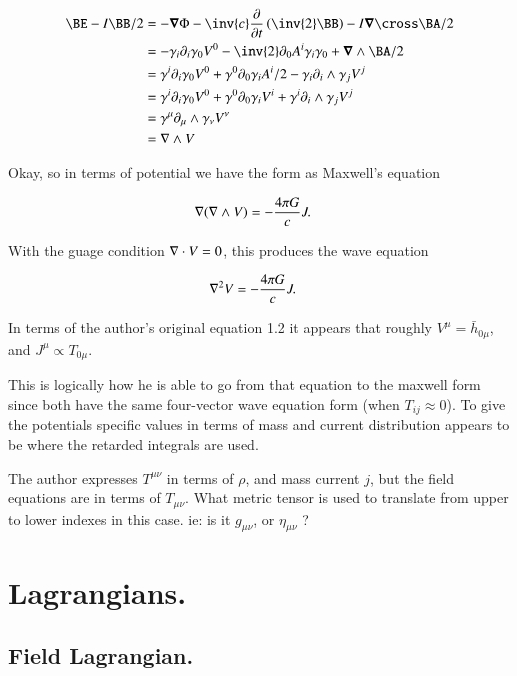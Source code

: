 \documentclass{article}
\newcommand{\barh}[0]{\bar{h}}
\begin{document}
\begin{align*}
\BE - I\BB/2 
&= - \spacegrad \Phi -\inv{c} \PD{t}{}\left( \inv{2} \BB \right) - I\spacegrad \cross \BA/2 \\
&= - \gamma_i \partial_i \gamma_0 V^0 - \inv{2} \partial_0 A^i \gamma_i \gamma_0 + \spacegrad \wedge \BA/2 \\
&= \gamma^i \partial_i \gamma_0 V^0 + \gamma^0 \partial_0 \gamma_i A^i/2 - \gamma_i \partial_i \wedge \gamma_j V^j \\
&= \gamma^i \partial_i \gamma_0 V^0 + \gamma^0 \partial_0 \gamma_i V^i + \gamma^i \partial_i \wedge \gamma_j V^j \\
&= \gamma^\mu \partial_\mu \wedge \gamma_\nu V^\nu \\
&= \grad \wedge V
\end{align*}

Okay, so in terms of potential we have the form as Maxwell's equation

\begin{align}\label{eqn:field}
\nabla (\nabla \wedge V) &= -\frac{4\pi G}{c} J.
\end{align}

With the guage condition $\nabla \cdot V = 0$, this produces the wave equation

\begin{align}
\nabla^2 V &= -\frac{4\pi G}{c} J.
\end{align}

In terms of the author's original equation 1.2 it appears that roughly 
$V^\mu = \barh_{0\mu}$, and $J^\mu \propto T_{0\mu}$.

This is logically how he is able to go from that equation to the maxwell
form since both have the same four-vector wave equation form (when $T_{ij} \approx 0$).  To give the potentials specific values in terms of mass and current
distribution appears to be where the retarded integrals are used.

The author expresses $T^{\mu\nu}$ in terms of $\rho$, and mass current $j$, but
the field equations are in terms of $T_{\mu\nu}$.  What metric tensor is
used to translate from upper to lower indexes in this case.  ie: is it $g_{\mu\nu}$, or $\eta_{\mu\nu}$ ?

\section{ Lagrangians. }

\subsection{ Field Lagrangian. }
\end{document}
